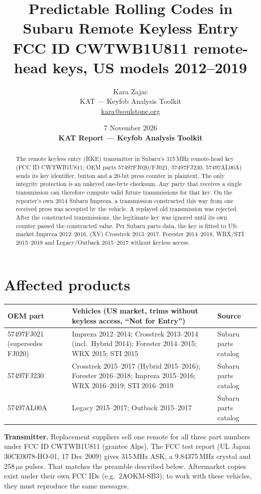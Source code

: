 \documentclass[11pt,a4paper]{article}
\title{Predictable Rolling Codes in Subaru Remote Keyless Entry\\[2pt]
\large FCC ID CWTWB1U811 remote-head keys, US models 2012--2019}
\author{Kara Zajac\\ \small KAT --- Keyfob Analysis Toolkit\\ \small \href{mailto:kara@soulstone.org}{kara@soulstone.org}}
\date{7 November 2026 \\[4pt] \small\textbf{KAT Report --- Keyfob Analysis Toolkit}}
\newcommand{\us}{\,$\mu$s}
\begin{document}
\maketitle

\begin{abstract}
The remote keyless entry (RKE) transmitter in Subaru's 315\,MHz remote-head key (FCC ID CWTWB1U811; OEM parts 57497FJ020/FJ021, 57497FJ230, 57497AL00A) sends its key identifier, button and a 20-bit press counter in plaintext. The only integrity protection is an unkeyed one-byte checksum. Any party that receives a single transmission can therefore compute valid future transmissions for that key. On the reporter's own 2014 Subaru Impreza, a transmission constructed this way from one received press was accepted by the vehicle. A replayed old transmission was rejected. After the constructed transmissions, the legitimate key was ignored until its own counter passed the constructed value. Per Subaru parts data, the key is fitted to US-market Impreza 2012--2016, (XV) Crosstrek 2013--2017, Forester 2014--2018, WRX/STI 2015--2019 and Legacy/Outback 2015--2017 without keyless access.
\end{abstract}

\section{Affected products}
\begin{table}[h]
\centering\small
\begin{tabularx}{\linewidth}{l X l}
\toprule
OEM part & Vehicles (US market, trims without keyless access, ``Not for Entry'') & Source \\
\midrule
57497FJ021 (supersedes FJ020) & Impreza 2012--2014; Crosstrek 2013--2014 (incl.\ Hybrid 2014); Forester 2014--2015; WRX 2015; STI 2015 & Subaru parts catalog \\
57497FJ230 & Crosstrek 2015--2017 (Hybrid 2015--2016); Forester 2016--2018; Impreza 2015--2016; WRX 2016--2019; STI 2016--2019 & Subaru parts catalog \\
57497AL00A & Legacy 2015--2017; Outback 2015--2017 & Subaru parts catalog \\
\bottomrule
\end{tabularx}
\end{table}

\noindent\textbf{Transmitter.} Replacement suppliers sell one remote for all three part numbers under FCC ID CWTWB1U811 (grantee Alps). The FCC test report (UL Japan 30CE0078-HO-01, 17 Dec 2009) gives 315\,MHz ASK, a 9.84375\,MHz crystal and 258\us{} pulses. That matches the preamble described below. Aftermarket copies exist under their own FCC IDs (e.g.\ 2AOKM-SB3); to work with these vehicles, they must reproduce the same messages.
\end{document}

